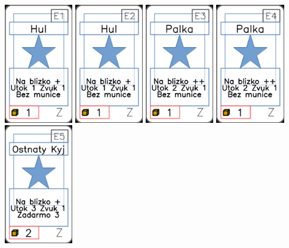 \documentclass[a4paper]{article}
\begin{document}
	\includegraphics[width=3.0cm]{img-1_80}
	\includegraphics[width=3.0cm]{img-1_81}
	\includegraphics[width=3.0cm]{img-1_82}
	\includegraphics[width=3.0cm]{img-1_83}
	\includegraphics[width=3.0cm]{img-1_84}
\end{document}
